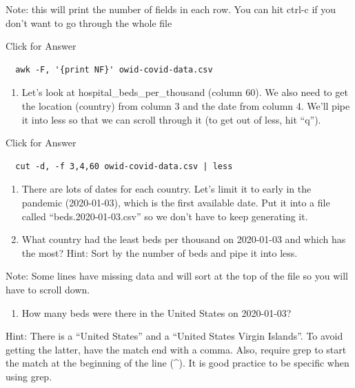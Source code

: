 \documentclass[
]{book}
\providecommand{\tightlist}{%
  \setlength{\itemsep}{0pt}\setlength{\parskip}{0pt}}
\begin{document}
Note: this will print the number of fields in each row. You can hit ctrl-c if you don't want to go through the whole file

Click for Answer

\begin{verbatim}
  awk -F, '{print NF}' owid-covid-data.csv
\end{verbatim}

\hfill\break

\begin{enumerate}
\def\labelenumi{\arabic{enumi}.}
\setcounter{enumi}{13}
\tightlist
\item
  Let's look at hospital\_beds\_per\_thousand (column 60). We also need to get the location (country) from column 3 and the date from column 4. We'll pipe it into less so that we can scroll through it (to get out of less, hit ``q'').
\end{enumerate}

Click for Answer

\begin{verbatim}
  cut -d, -f 3,4,60 owid-covid-data.csv | less
\end{verbatim}

\hfill\break

\begin{enumerate}
\def\labelenumi{\arabic{enumi}.}
\setcounter{enumi}{14}
\item
  There are lots of dates for each country. Let's limit it to early in the pandemic (2020-01-03), which is the first available date. Put it into a file called ``beds.2020-01-03.csv'' so we don't have to keep generating it.
\item
  What country had the least beds per thousand on 2020-01-03 and which has the most? Hint: Sort by the number of beds and pipe it into less.
\end{enumerate}

Note: Some lines have missing data and will sort at the top of the file so you will have to scroll down.

\begin{enumerate}
\def\labelenumi{\arabic{enumi}.}
\setcounter{enumi}{16}
\tightlist
\item
  How many beds were there in the United States on 2020-01-03?
\end{enumerate}

Hint: There is a ``United States'' and a ``United States Virgin Islands''. To avoid getting the latter, have the match end with a comma. Also, require grep to start the match at the beginning of the line (\^{}). It is good practice to be specific when using grep.
\end{document}
